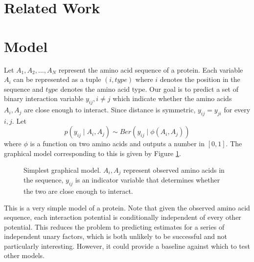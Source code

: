 \documentclass{article}
\begin{document}
\section{Related Work}

\section{Model}
Let $A_1, A_2, \ldots, A_N$ represent the amino acid sequence of a protein. Each variable $A_i$ can be represented as a tuple $(i, type)$ where $i$ denotes the position in the sequence and $type$ denotes the amino acid type. Our goal is to predict a set of binary interaction variable $y_{ij}, i \neq j$ which indicate whether the amino acids $A_i, A_j$ are close enough to interact. Since distance is symmetric, $y_{ij} = y_{ji}$ for every $i, j$. Let 
\[
p(y_{ij} \mid A_i, A_j) \sim Ber(y_{ij} \mid \phi(A_i, A_j))
\]
where $\phi$ is a function on two amino acids and outputs a number in $[0, 1]$. The graphical model corresponding to this is given by Figure \ref{fig:naive_model}.
\begin{figure}[H]
\centering
{}
\caption{Simplest graphical model. $A_i, A_j$ represent observed amino acids in the sequence, $y_{ij}$ is an indicator variable that determines whether the two are close enough to interact.}
\label{fig:naive_model}
\end{figure}
This is a very simple model of a protein. Note that given the observed amino acid sequence, each interaction potential is conditionally independent of every other potential. This reduces the problem to predicting estimates for a series of independent unary factors, which is both unlikely to be successful and not particularly interesting. However, it could provide a baseline against which to test other models.
\end{document}
